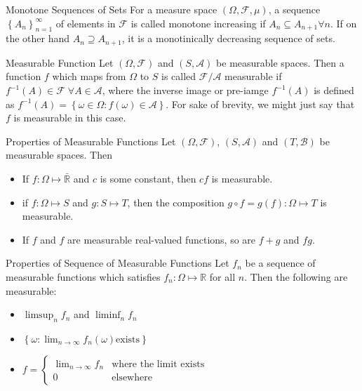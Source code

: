 \documentclass[avery5371,grid]{flashcards}
\begin{document}
\begin{flashcard}[Definition]{Monotone Sequences of Sets}
 For a measure space $\left( \Omega,\mathcal{F},\mu \right)$,
 a sequence $\left\{ A_n \right\}_{n=1}^\infty$ of elements in $\mathcal{F}$
 is called monotone increasing if $A_n \subseteq A_{n+1} \forall n$. If on the other hand
 $A_n \supseteq A_{n+1}$, it is a monotinically decreasing sequence of sets.
\end{flashcard}

\begin{flashcard}[Definition]{Measurable Function}
 Let $\left( \Omega,\mathcal{F} \right)$ and $\left( S,\mathcal{A} \right)$
 be measurable spaces. Then a function $f$ which maps from $\Omega$ to $S$ is called
 $\mathcal{F} / \mathcal{A}$ measurable if $f^{-1}\left( A \right) \in \mathcal{F} \; \forall A \in \mathcal{A}$,
 where the inverse image or pre-iamge $f^{-1}\left( A \right)$ is defined as
 $f^{-1}\left( A \right) = \left\{ \omega \in \Omega : f\left( \omega \right) \in \mathcal{A} \right\}$. For sake of 
 brevity, we might just say that $f$ is measurable in this case.
\end{flashcard}

\begin{flashcard}[Theorem]{Properties of Measurable Functions}
 Let $\left( \Omega,\mathcal{F} \right)$, $\left( S,\mathcal{A} \right)$
 and $\left( T,\mathcal{B} \right)$ be measurable spaces. Then
 \begin{itemize}
  \item If $f : \Omega \mapsto \bar{\mathbb{R}}$ and $c$ is some constant, then
  $cf$ is measurable.
  \item if $f : \Omega \mapsto S$ and $g : S \mapsto T$, then the composition $g \circ f = g(f) : \Omega \mapsto T$ is
  measurable. 
  \item If $f$ and $f$ are measurable real-valued functions, so are $f+g$ and $fg$.
 \end{itemize}
\end{flashcard}

\begin{flashcard}[Theorem]{Properties of Sequence of Measurable Functions}
 Let $f_n$ be a sequence of measurable functions which satisfies $f_n : \Omega \mapsto \mathbb{R}$
 for all $n$. Then the following are measurable:
 \begin{itemize}
  \item $\limsup_n f_n$ and $\liminf_n f_n$
  \item $\left\{ \omega : \lim_{n \to \infty} f_n\left( \omega \right) \text{exists}\right\}$
  \item $f = \begin{cases}
              \lim_{n \to \infty} f_n & \text{where the limit exists} \\
              0 & \text{elsewhere}
             \end{cases}
$
 \end{itemize}

\end{flashcard}
\end{document}
